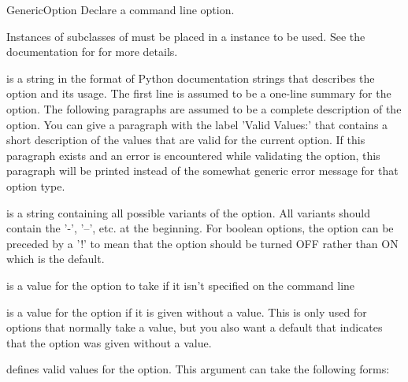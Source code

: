 \begin{classdesc}{GenericOption}{
}
Declare a command line option.

Instances of subclasses of  must be placed in
a  instance to be used.  See the documentation for
 for more details.

 is a string in the format of Python documentation
   strings that describes the option and its usage.  The first
   line is assumed to be a one-line summary for the option.
   The following paragraphs are assumed to be a complete description
   of the option.  You can give a paragraph with the label
   'Valid Values:' that contains a short description of the
   values that are valid for the current option.  If this
   paragraph exists and an error is encountered while validating
   the option, this paragraph will be printed instead of the
   somewhat generic error message for that option type.

 is a string containing all possible variants of the
   option.  All variants should contain the '-', '--', etc. at
   the beginning.  For boolean options, the option can be preceded
   by a '!' to mean that the option should be turned OFF rather
   than ON which is the default.

 is a value for the option to take if it isn't specified
   on the command line

 is a value for the option if it is given without a value.
   This is only used for options that normally take a value,
   but you also want a default that indicates that the option
   was given without a value.

 defines valid values for the option.  This argument can take
   the following forms:
        


\end{classdesc}
